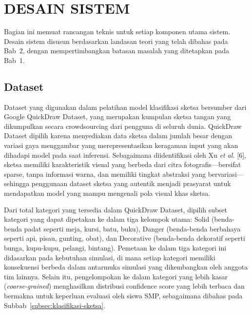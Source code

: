 \documentclass[12pt,oneside]{report}
\begin{document}
\section{DESAIN SISTEM}
\label{sec:desain-sistem}

Bagian ini memuat rancangan teknis untuk setiap komponen utama sistem. Desain sistem disusun berdasarkan landasan teori yang telah dibahas pada Bab~2, dengan mempertimbangkan batasan masalah yang ditetapkan pada Bab~1.

\subsection{Dataset}
\label{subsec:dataset}

Dataset yang digunakan dalam pelatihan model klasifikasi sketsa bersumber dari Google QuickDraw Dataset, yang merupakan kumpulan sketsa tangan yang dikumpulkan secara crowdsourcing dari pengguna di seluruh dunia. QuickDraw Dataset dipilih karena menyediakan data sketsa dalam jumlah besar dengan variasi gaya menggambar yang merepresentasikan keragaman input yang akan dihadapi model pada saat inferensi. Sebagaimana diidentifikasi oleh Xu \textit{et al.} [6], sketsa memiliki karakteristik visual yang berbeda dari citra fotografis—bersifat sparse, tanpa informasi warna, dan memiliki tingkat abstraksi yang bervariasi—sehingga penggunaan dataset sketsa yang autentik menjadi prasyarat untuk mendapatkan model yang mampu mengenali pola visual khas sketsa.

Dari total kategori yang tersedia dalam QuickDraw Dataset, dipilih subset kategori yang dapat dipetakan ke dalam tiga kelompok utama: Solid (benda-benda padat seperti meja, kursi, batu, buku), Danger (benda-benda berbahaya seperti api, pisau, gunting, obat), dan Decorative (benda-benda dekoratif seperti bunga, kupu-kupu, pelangi, bintang). Pemetaan ke dalam tiga kategori ini didasarkan pada kebutuhan simulasi, di mana setiap kategori memiliki konsekuensi berbeda dalam antarmuka simulasi yang dikembangkan oleh anggota tim lainnya. Selain itu, pengelompokan ke dalam kategori yang lebih kasar (\textit{coarse-grained}) menghasilkan distribusi confidence score yang lebih terbaca dan bermakna untuk keperluan evaluasi oleh siswa SMP, sebagaimana dibahas pada Subbab~\ref{subsec:klasifikasi-sketsa}.
\end{document}
